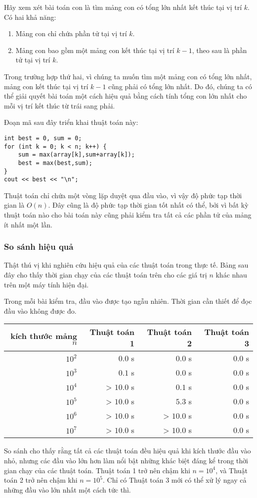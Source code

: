 Hãy xem xét bài toán con là tìm mảng con có tổng lớn nhất
kết thúc tại vị trí $k$.
Có hai khả năng:
\begin{enumerate}
\item Mảng con chỉ chứa phần tử tại vị trí $k$.
\item Mảng con bao gồm một mảng con kết thúc
tại vị trí $k-1$, theo sau là phần tử tại vị trí $k$.
\end{enumerate}

Trong trường hợp thứ hai, vì chúng ta muốn
tìm một mảng con có tổng lớn nhất,
mảng con kết thúc tại vị trí $k-1$
cũng phải có tổng lớn nhất.
Do đó, chúng ta có thể giải quyết bài toán một cách hiệu quả
bằng cách tính tổng con lớn nhất
cho mỗi vị trí kết thúc từ trái sang phải.

Đoạn mã sau đây triển khai thuật toán này:
\begin{lstlisting}
int best = 0, sum = 0;
for (int k = 0; k < n; k++) {
    sum = max(array[k],sum+array[k]);
    best = max(best,sum);
}
cout << best << "\n";
\end{lstlisting}

Thuật toán chỉ chứa một vòng lặp
duyệt qua đầu vào,
vì vậy độ phức tạp thời gian là $O(n)$.
Đây cũng là độ phức tạp thời gian tốt nhất có thể,
bởi vì bất kỳ thuật toán nào cho bài toán này
cũng phải kiểm tra tất cả các phần tử của mảng ít nhất một lần.

\subsubsection{So sánh hiệu quả}

Thật thú vị khi nghiên cứu hiệu quả của các
thuật toán trong thực tế.
Bảng sau đây cho thấy thời gian chạy
của các thuật toán trên cho các
giá trị $n$ khác nhau trên một máy tính hiện đại.

Trong mỗi bài kiểm tra, đầu vào được tạo ngẫu nhiên.
Thời gian cần thiết để đọc đầu vào không được đo.

\begin{center}
\begin{tabular}{rrrr}
kích thước mảng $n$ & Thuật toán 1 & Thuật toán 2 & Thuật toán 3 \\
\hline
$10^2$ & $0.0$ s & $0.0$ s & $0.0$ s \\
$10^3$ & $0.1$ s & $0.0$ s & $0.0$ s \\
$10^4$ & > $10.0$ s & $0.1$ s & $0.0$ s \\
$10^5$ & > $10.0$ s & $5.3$ s & $0.0$ s \\
$10^6$ & > $10.0$ s & > $10.0$ s & $0.0$ s \\
$10^7$ & > $10.0$ s & > $10.0$ s & $0.0$ s \\
\end{tabular}
\end{center}

So sánh cho thấy rằng tất cả các thuật toán
đều hiệu quả khi kích thước đầu vào nhỏ,
nhưng các đầu vào lớn hơn làm nổi bật những
khác biệt đáng kể trong thời gian chạy của các thuật toán.
Thuật toán 1 trở nên chậm
khi $n=10^4$, và Thuật toán 2
trở nên chậm khi $n=10^5$.
Chỉ có Thuật toán 3 mới có thể xử lý
ngay cả những đầu vào lớn nhất một cách tức thì.